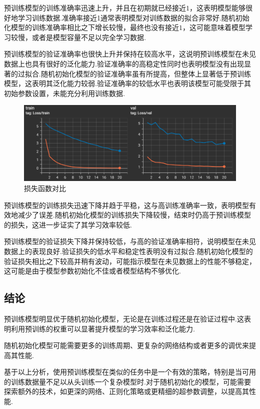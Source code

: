 \documentclass[notitlepage,cs4size,punct,oneside]{ctexrep}
\numberwithin{equation}{chapter}
\theoremstyle{mystyle}
\begin{document}
预训练模型的训练准确率迅速上升，并且在初期就已经接近$1$，这表明模型能够很好地学习训练数据.准确率接近1通常表明模型对训练数据的拟合非常好.随机初始化模型的训练准确率相比之下增长较慢，最终也没有接近$1$，这可能意味着模型学习较慢，或者是模型容量不足以完全学习数据.

预训练模型的验证准确率也很快上升并保持在较高水平，这说明预训练模型在未见数据上也具有很好的泛化能力.验证准确率的高稳定性同时也表明模型没有出现显著的过拟合.随机初始化模型的验证准确率虽有所提高，但整体上显著低于预训练模型，这表明其泛化能力较弱.验证准确率的较低水平也表明该模型可能受限于其初始参数设置，未能充分利用训练数据.


\begin{figure}[H]
    \centering
    \includegraphics[scale=0.75]{loss.png}
    \caption{损失函数对比}
    \label{fig:loss}
\end{figure}

预训练模型的训练损失迅速下降并趋于平稳，这与高训练准确率一致，表明模型有效地减少了误差.随机初始化模型的训练损失下降较慢，结束时仍高于预训练模型的损失，这进一步证实了其学习效率较低.

预训练模型的验证损失下降并保持较低，与高的验证准确率相符，说明模型在未见数据上的表现良好.验证损失的低水平和稳定性表明没有过拟合.随机初始化模型的验证损失相比之下较高并稍有波动，可能指示模型在未见数据上的性能不够稳定，这可能是由于模型参数初始化不佳或者模型结构不够优化.

\subsection{结论}
预训练模型明显优于随机初始化模型，无论是在训练过程还是在验证过程中.这表明利用预训练的权重可以显著提升模型的学习效率和泛化能力.

随机初始化模型可能需要更多的训练周期、更复杂的网络结构或者更多的调优来提高其性能.

基于以上分析，使用预训练模型在类似的任务中是一个有效的策略，特别是当可用的训练数据量不足以从头训练一个复杂模型时.对于随机初始化的模型，可能需要探索额外的技术，如更深的网络、正则化策略或更精细的超参数调整，以提高其性能.
\end{document}

